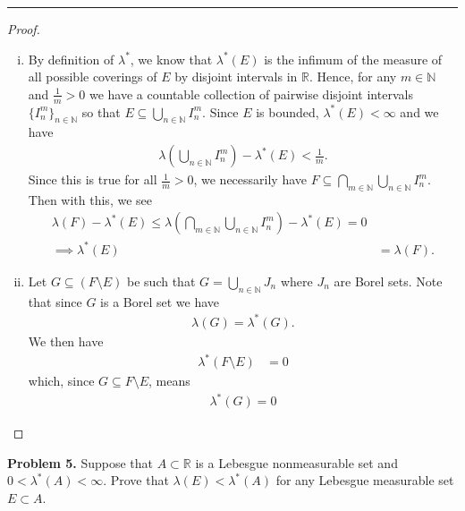 \documentclass[leqno]{article}
\theoremstyle{nonumberplain}
\newtheorem{proof}{Proof}
\newcommand{\R}{\mathbb{R}}
\newcommand{\N}{\mathbb{N}}
\begin{document}
\noindent\rule[0.5ex]{\linewidth}{1pt}


\begin{proof}~
\begin{enumerate}[(i)]
\item By definition of $\lambda^*$, we know that $\lambda^*(E)$ is the infimum of the measure of all possible coverings of $E$ by disjoint intervals in $\R$.  Hence, for any $m\in \N$ and $\frac{1}{m}>0$ we have a countable collection of pairwise disjoint intervals $\{I_n^m\}_{n\in \N}$ so that $E\subseteq \bigcup_{n\in \N} I_n^m$. Since $E$ is bounded, $\lambda^*(E)<\infty$ and we have
\begin{align*}
\lambda\left(\bigcup_{n\in \N} I_n^m \right) - \lambda^*(E)<\frac{1}{m}.
\end{align*}
Since this is true for all $\frac{1}{m}>0$, we necessarily have $F\subseteq \bigcap_{m\in \N}\bigcup_{n\in \N} I_n^m$. Then with this, we see 
\begin{align*}
\lambda(F) - \lambda^*(E)\leq \lambda \left( \bigcap_{m\in \N}\bigcup_{n\in \N} I_n^m \right) - \lambda^*(E)=0\\
\implies \lambda^*(E)&=\lambda(F).
\end{align*}


\item Let $G\subseteq (F\setminus E)$ be such that $G=\bigcup_{n\in \N} J_n$ where $J_n$ are Borel sets. Note that since $G$ is a Borel set we have
\begin{align*}
\lambda(G)=\lambda^*(G).
\end{align*}
We then have
\begin{align*}
\lambda^*(F\setminus E)&=0
\end{align*}
which, since $G\subseteq F\setminus E$, means
\begin{align*}
\lambda^*(G)=0
\end{align*}
\end{enumerate}
\end{proof}

\pagebreak




\noindent\textbf{Problem 5.} \quad
Suppose that $A\subset \R$ is a Lebesgue nonmeasurable set and $0<\lambda^*(A)<\infty$. Prove that $\lambda(E)<\lambda^*(A)$ for any Lebesgue measurable set $E\subset A$.
\end{document}
